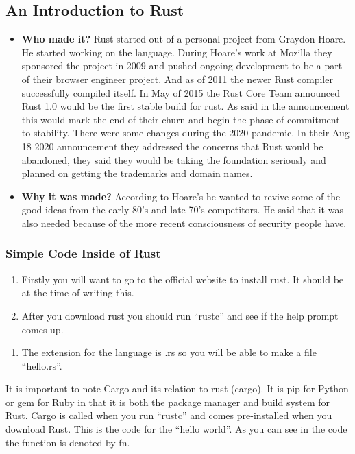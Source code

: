 \documentclass{article}
\theoremstyle{theorem}
\theoremstyle{definition}
\theoremstyle{remark}
\begin{document}
\subsection{An Introduction to Rust }
    \begin{itemize}

\item \textbf{Who made it?}  Rust started out of a personal project from Graydon Hoare. He started working on the language. During Hoare’s work at Mozilla they sponsored the project in 2009 and pushed ongoing development to be a part of their browser engineer project. And as of 2011 the newer Rust compiler successfully compiled itself.  In May of 2015 the Rust Core Team announced Rust 1.0 would be the first stable build for rust. As said in the announcement this would mark the end of their churn and begin the phase of commitment to stability. There were some changes during the 2020 pandemic. In their Aug 18 2020 announcement they addressed the concerns that Rust would be abandoned, they said they would be taking the foundation seriously and planned on getting the trademarks and domain names.\cite{IOR} 
\item \textbf{Why it was made?}  According to Hoare’s he wanted to revive some of the good ideas from the early 80’s and late 70’s competitors. He said that it was also needed because of the more recent consciousness of security people have.\cite{IOR} 

\end{itemize}

\subsubsection{Simple Code Inside of Rust}
\medskip 
\begin{enumerate}
\item Firstly you will want to go to the official website to install rust. It should be  at the time of writing this.\cite{IR} 
\item After you download rust you should run “rustc” and see if the help prompt comes up. 
\end{enumerate}
\begin{enumerate}
\item The extension for the language is .rs so you will be able to make a file “hello.rs”. 
\end{enumerate}

\medskip\noindent
It is important to note Cargo and its relation to rust (cargo)\cite{RB}. It is pip for Python or gem for Ruby in that it is both the package manager and build system for Rust. Cargo is called when you run “rustc” and comes pre-installed when you download Rust.
\medskip \noindent
This is the code for the “hello world”. As you can see in the code the function is denoted by fn.
\end{document}
